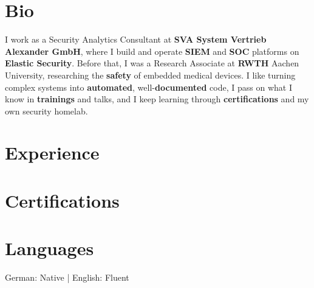 \documentclass[a4paper]{twentysecondcv} %
\begin{document}
\makeprofile %

\section{Bio}
I work as a Security Analytics Consultant at \textbf{SVA System Vertrieb Alexander GmbH}, where I build and operate \textbf{SIEM} and \textbf{SOC} platforms on \textbf{Elastic Security}. Before that, I was a Research Associate at \textbf{RWTH} Aachen University, researching the \textbf{safety} of embedded medical devices. I like turning complex systems into \textbf{automated}, well-\textbf{documented} code, I pass on what I know in \textbf{trainings} and talks, and I keep learning through \textbf{certifications} and my own security homelab.


\section{Experience}



\section{Certifications}


\section{Languages}
German: Native \hspace{2mm} | \hspace{2mm} English: Fluent
\end{document}
